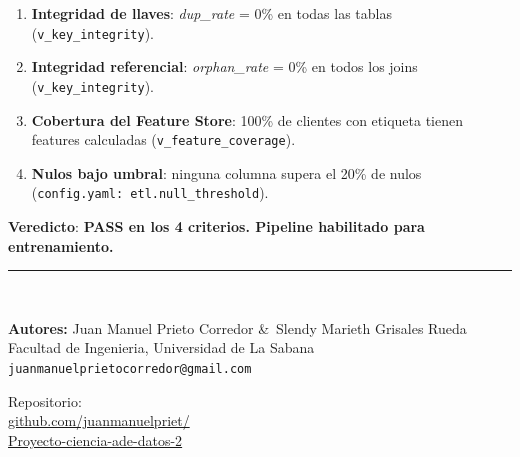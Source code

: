 \documentclass[11pt,a4paper]{article}
\newcommand{\alertbox}[2]{%
  \begin{tcolorbox}[colback=red!7!white,colframe=accent,
    title={\bfseries\color{accent}#1},
    left=6pt, right=6pt, top=4pt, bottom=4pt, boxrule=0.8pt, arc=4pt]
    #2
  \end{tcolorbox}%
}
\begin{document}
\alertbox{Criterios Formales Verificados Antes de Liberar el Modelo}{%
  \begin{enumerate}[leftmargin=1.5em, itemsep=2pt]
    \item \textbf{Integridad de llaves}: \textit{dup\_rate} = 0\% en todas las tablas
          (\texttt{v\_key\_integrity}).
    \item \textbf{Integridad referencial}: \textit{orphan\_rate} = 0\% en todos los joins
          (\texttt{v\_key\_integrity}).
    \item \textbf{Cobertura del Feature Store}: 100\% de clientes con etiqueta tienen
          features calculadas (\texttt{v\_feature\_coverage}).
    \item \textbf{Nulos bajo umbral}: ninguna columna supera el 20\% de nulos
          (\texttt{config.yaml: etl.null\_threshold}).
  \end{enumerate}
  \textbf{Veredicto}: \textcolor{success}{\textbf{PASS en los 4 criterios.
  Pipeline habilitado para entrenamiento.}}
}

\vfill
\noindent\rule{\linewidth}{0.4pt}\\[4pt]
\begin{minipage}{0.58\linewidth}
  \small\color{darkgray}
  \textbf{Autores:} Juan Manuel Prieto Corredor \&\ Slendy Marieth Grisales Rueda\\
  Facultad de Ingenieria, Universidad de La Sabana\\
  \texttt{juanmanuelprietocorredor@gmail.com}
\end{minipage}
\hfill
\begin{minipage}{0.38\linewidth}
  \RaggedLeft\small\color{darkgray}
  Repositorio:\\
  \url{github.com/juanmanuelpriet/}\\
  \url{Proyecto-ciencia-ade-datos-2}
\end{minipage}
\end{document}
